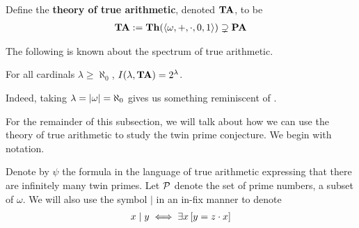 \begin{boxdefinition}\label{Ch1:Def:True_Arith}
    Define the \textbf{theory of true arithmetic}, denoted $\mathbf{TA}$, to be
    \begin{align*}
        \mathbf{TA} := \mathbf{Th}\!\left( \left\langle \omega, +, \cdot, 0, 1 \right\rangle \right) \supsetneq \mathbf{PA}
    \end{align*}
\end{boxdefinition}

The following is known about the spectrum of true arithmetic.

\begin{boxtheorem}\label{Ch1:Thm:Spectrum_of_TA}
    For all cardinals $\lambda \geq \aleph_0$, $I\!\left( \lambda, \mathbf{TA} \right) = 2^{\lambda}$.
\end{boxtheorem}

Indeed, taking $\lambda = \left\lvert \omega \right\rvert = \aleph_0$ gives us something reminiscent of .

For the remainder of this subsection, we will talk about how we can use the theory of true arithmetic to study the twin prime conjecture. We begin with notation.

\begin{boxlnotation}
    Denote by $\psi$ the formula in the language of true arithmetic expressing that there are infinitely many twin primes. Let $\mathcal{P}$ denote the set of prime numbers, a subset of $\omega$. We will also use the symbol $\mid$ in an in-fix manner to denote
    \begin{align*}
        x \mid y \iff \exists x \left[ y = z \cdot x \right]
    \end{align*}
\end{boxlnotation}

